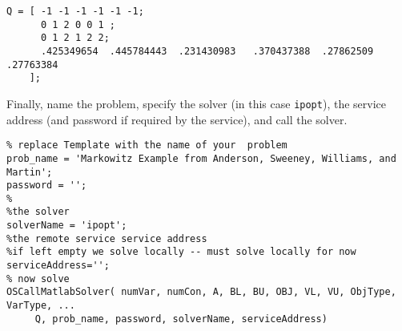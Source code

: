 \begin{verbatim}
Q = [ -1 -1 -1 -1 -1 -1;
      0 1 2 0 0 1 ;
      0 1 2 1 2 2;
      .425349654  .445784443  .231430983   .370437388  .27862509   .27763384
    ];
\end{verbatim}


Finally, name the problem, specify the solver (in this case {\tt ipopt}), the service address (and password if required by the service), and call the solver.



\begin{verbatim}
% replace Template with the name of your  problem
prob_name = 'Markowitz Example from Anderson, Sweeney, Williams, and Martin';
password = '';
%
%the solver
solverName = 'ipopt';
%the remote service service address
%if left empty we solve locally -- must solve locally for now
serviceAddress='';
% now solve
OSCallMatlabSolver( numVar, numCon, A, BL, BU, OBJ, VL, VU, ObjType, VarType, ...
     Q, prob_name, password, solverName, serviceAddress)
\end{verbatim}

